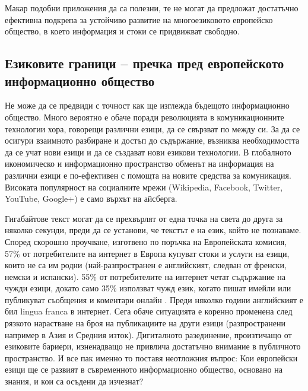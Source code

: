 \documentclass[]{../../metanetpaper}
\begin{document}
\begin{multicols}{2}
Макар подобни приложения да са полезни, те не могат да предложат достатъчно ефективна подкрепа за устойчиво развитие на многоезиковото европейско общество, в което информация и стоки се придвижват свободно.

\subsection{Езиковите граници -- пречка пред европейското информационно общество}
  
Не може да се предвиди с точност как ще изглежда
бъдещото информационно общество. Много вероятно е обаче поради революцията в комуникационните технологии хора, говорещи различни езици, да се свързват по между си.
За да се осигури взаимното разбиране и достъп до съдържание, възниква необходимостта да се учат нови езици и да се създават нови езикови технологии. В глобалното икономическо и информационно пространство обменът на информация на различни езици е по-ефективен с помощта на новите средства за комуникация. Високата популярност на социалните мрежи (Wikipedia, Facebook, Twitter, YouTube, Google+) е само върхът на айсберга.


Гигабайтове текст могат да се прехвърлят от една точка на света до друга за няколко секунди, преди да се установи, че текстът е на език, който не познаваме. Според скорошно проучване, изготвено по поръчка на Европейската
 комисия, 57\% от потребителите на интернет в Европа
 купуват стоки и услуги на езици, които не са им родни
 (най-разпространен е английският, следван от
 френски, немски и испански). 55\% от потребителите на интернет четат съдържание на чужди езици, докато само 35\% използват чужд език, когато пишат имейли или публикуват съобщения и коментари онлайн \cite{EC1}. Преди няколко
 години английският е бил lingua franca в интернет. Сега обаче ситуацията е коренно променена след  рязкото нарастване  на броя на публикациите на други езици (разпространени например в Азия и Средния изток). Дигиталното разединение, произтичащо от езиковите бариери, 
 изненадващо не привлича достатъчно внимание в публичното
 пространство. И все пак именно то поставя неотложния
 въпрос: Кои европейски езици ще се развият в съвременното информационно общество, основано на знания, и кои са осъдени да изчезнат?


\end{multicols}
\end{document}
